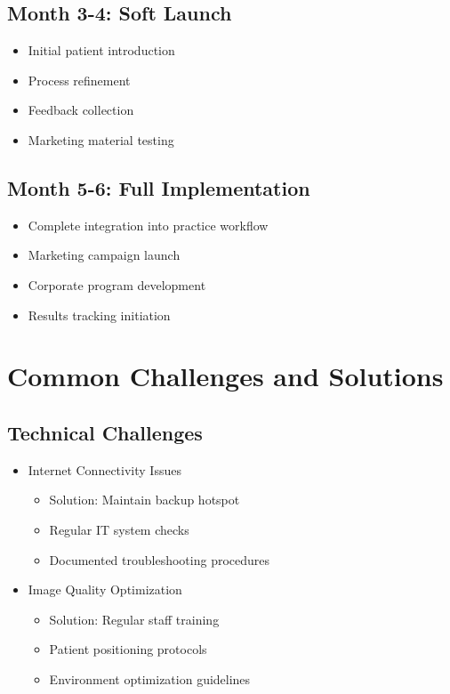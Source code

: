 \documentclass[
  Letterpaper,
]{scrbook}
\providecommand{\tightlist}{%
  \setlength{\itemsep}{0pt}\setlength{\parskip}{0pt}}\usepackage{longtable,booktabs,array}
\begin{document}
\subsection{Month 3-4: Soft Launch}\label{month-3-4-soft-launch}

\begin{itemize}
\tightlist
\item
  Initial patient introduction
\item
  Process refinement
\item
  Feedback collection
\item
  Marketing material testing
\end{itemize}

\subsection{Month 5-6: Full
Implementation}\label{month-5-6-full-implementation}

\begin{itemize}
\tightlist
\item
  Complete integration into practice workflow
\item
  Marketing campaign launch
\item
  Corporate program development
\item
  Results tracking initiation
\end{itemize}

\section{Common Challenges and
Solutions}\label{common-challenges-and-solutions}

\subsection{Technical Challenges}\label{technical-challenges}

\begin{itemize}
\tightlist
\item
  Internet Connectivity Issues

  \begin{itemize}
  \tightlist
  \item
    Solution: Maintain backup hotspot
  \item
    Regular IT system checks
  \item
    Documented troubleshooting procedures
  \end{itemize}
\item
  Image Quality Optimization

  \begin{itemize}
  \tightlist
  \item
    Solution: Regular staff training
  \item
    Patient positioning protocols
  \item
    Environment optimization guidelines
  \end{itemize}
\end{itemize}
\end{document}
